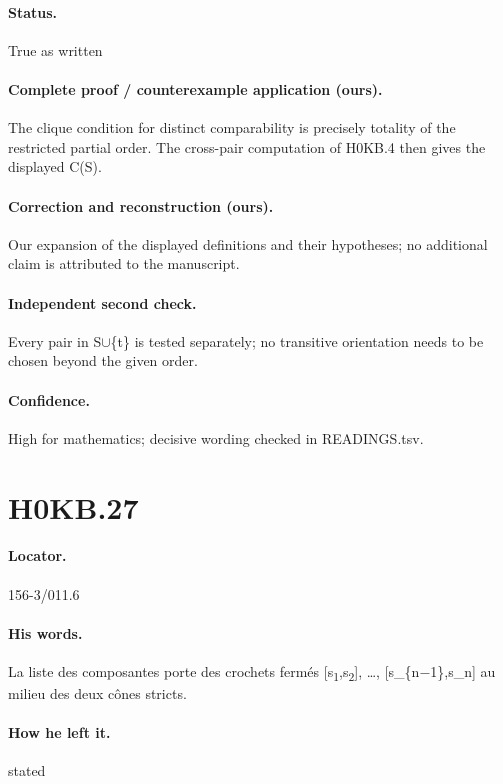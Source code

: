 \paragraph{Status.} True as written

\paragraph{Complete proof / counterexample application (ours).} The clique condition for distinct comparability is precisely totality of the restricted partial order. The cross-pair computation of H0KB.4 then gives the displayed C(S).

\paragraph{Correction and reconstruction (ours).} Our expansion of the displayed definitions and their hypotheses; no additional claim is attributed to the manuscript.

\paragraph{Independent second check.} Every pair in S\ensuremath{\cup}\{t\} is tested separately; no transitive orientation needs to be chosen beyond the given order.

\paragraph{Confidence.} High for mathematics; decisive wording checked in READINGS.tsv.

\section*{H0KB.27}\label{statement:H0KB.27}
\paragraph{Locator.} 156-3/011.6

\paragraph{His words.} La liste des composantes porte des crochets fermés [s\textsubscript{1},s\textsubscript{2}], …, [s\_\{n\ensuremath{-}1\},s\_n] au milieu des deux cônes stricts.

\paragraph{How he left it.} stated

